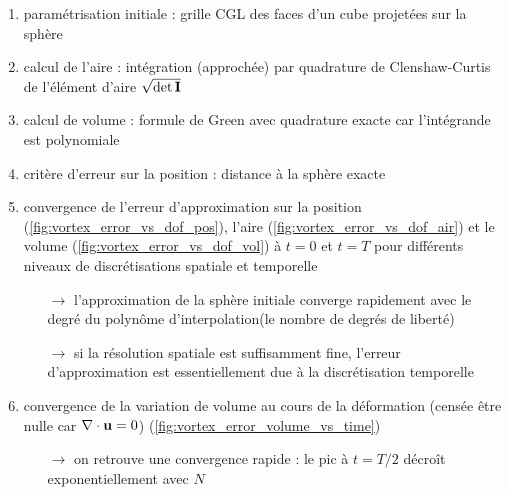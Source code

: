 \begin{enumerate}
	\item paramétrisation initiale : grille CGL des faces d'un cube projetées sur la sphère%
	\item calcul de l'aire : intégration (approchée) par quadrature de Clenshaw-Curtis de l'élément d'aire $\sqrt{\det{\mathbf{I}}}$
	\item calcul de volume : formule de Green avec quadrature exacte car l'intégrande est polynomiale %
	\item critère d'erreur sur la position : distance à la sphère exacte
	\item convergence de l'erreur d'approximation sur la position (\autoref{fig:vortex_error_vs_dof_pos}), l'aire (\autoref{fig:vortex_error_vs_dof_air}) et le volume (\autoref{fig:vortex_error_vs_dof_vol}) à $t = 0$ et $t = T$ pour différents niveaux de discrétisations spatiale et temporelle 
	\begin{itemize}
		\item[$\to$] l'approximation de la sphère initiale converge rapidement avec le degré du polynôme d'interpolation(\ie le nombre de degrés de liberté)
		\item[$\to$] si la résolution spatiale est suffisamment fine, l'erreur d'approximation est essentiellement due à la discrétisation temporelle
	\end{itemize}
	\item convergence de la variation de volume au cours de la déformation (censée être nulle car $\nabla \cdot \mathbf{u} = 0$) (\autoref{fig:vortex_error_volume_vs_time})
	\begin{itemize}
		\item[$\to$] on retrouve une convergence rapide : le pic à $t = T/2$ décroît exponentiellement avec $N$ 
	\end{itemize}
\end{enumerate}


